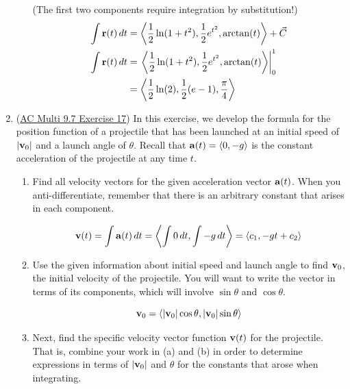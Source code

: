 \begin{enumerate}[leftmargin=0pt]
\begin{enumerate}
    \begin{red}
        (The first two components require integration by substitution!)
        \begin{align*}
            \int\mathbf{r}(t)\, dt &= \left\langle
                \frac12 \ln(1+t^2),
                \frac12 e^{t^2},
                \arctan(t)
            \right\rangle + \vec{C}\\
            \int\mathbf{r}(t)\, dt &= \left.\left\langle
                \frac12 \ln(1+t^2),
                \frac12 e^{t^2},
                \arctan(t)
            \right\rangle \right|_0^1 \\
            &= \left\langle
                \frac12 \ln(2),
                \frac12 (e - 1),
                \frac{\pi}{4}
            \right\rangle
        \end{align*}
    \end{red}
\end{enumerate}

\item (\href{https://activecalculus.org/multi/S-9-7-Vector-Valued-Functions-Derivatives.html#Ez_9_7_5}{AC Multi 9.7 Exercise 17}) In this exercise, we develop the formula for the position function of a projectile that has been launched at an initial speed of $|\mathbf{v}_0|$ and a launch angle of $\theta$. Recall that $\mathbf{a}(t) = \langle 0, -g\rangle$ is the constant acceleration of the projectile at any time $t$.
\begin{enumerate}
    \item Find all velocity vectors for the given acceleration vector $\mathbf{a}(t)$. When you anti-differentiate, remember that there is an arbitrary constant that arises in each component.
    \begin{red}
        \begin{equation*}
            \mathbf{v}(t) = \int \mathbf{a}(t)\, dt = \left\langle
                \int 0\, dt,
                \int -g\, dt
            \right\rangle
            = \left\langle
                c_1, -gt + c_2
            \right\rangle
        \end{equation*}
    \end{red}
    \item Use the given information about initial speed and launch angle to find $\mathbf{v}_0$, the initial velocity of the projectile. You will want to write the vector in terms of its components, which will involve $\sin\theta$ and $\cos\theta$.
    \begin{red}
        \begin{equation*}
            \mathbf{v}_0 = 
            \left\langle |\mathbf{v}_0|\cos\theta, |\mathbf{v}_0|\sin\theta \right\rangle 
        \end{equation*}
    \end{red}
    \item Next, find the specific velocity vector function $\mathbf{v}(t)$ for the projectile. That is, combine your work in (a) and (b) in order to determine expressions in terms of $|\mathbf{v}_0|$ and $\theta$ for the constants that arose when integrating.


\end{enumerate}
\end{enumerate}
